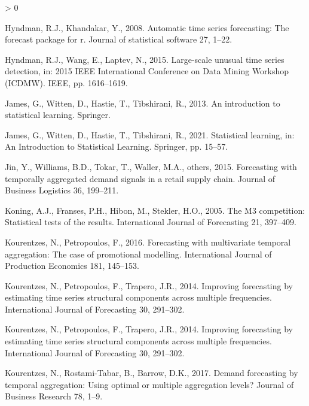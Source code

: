 \documentclass[]{elsarticle} %
\newlength{\cslhangindent}
\newenvironment{CSLReferences}[2] %
 {%
  \setlength{\parindent}{0pt}
  \ifodd #1 \everypar{\setlength{\hangindent}{\cslhangindent}}\ignorespaces\fi
  \ifnum #2 > 0
  \setlength{\parskip}{#2\baselineskip}
  \fi
 }%
 {}
\begin{document}
\begin{CSLReferences}{1}{0}
\leavevmode\hypertarget{ref-hyndman2008automatic}{}%
Hyndman, R.J., Khandakar, Y., 2008. Automatic time series forecasting:
The forecast package for r. Journal of statistical software 27, 1--22.

\leavevmode\hypertarget{ref-hyndman2015large}{}%
Hyndman, R.J., Wang, E., Laptev, N., 2015. Large-scale unusual time
series detection, in: 2015 IEEE International Conference on Data Mining
Workshop (ICDMW). IEEE, pp. 1616--1619.

\leavevmode\hypertarget{ref-james2013introduction}{}%
James, G., Witten, D., Hastie, T., Tibshirani, R., 2013. An introduction
to statistical learning. Springer.

\leavevmode\hypertarget{ref-james2021statistical}{}%
James, G., Witten, D., Hastie, T., Tibshirani, R., 2021. Statistical
learning, in: An Introduction to Statistical Learning. Springer, pp.
15--57.

\leavevmode\hypertarget{ref-jin2015forecasting}{}%
Jin, Y., Williams, B.D., Tokar, T., Waller, M.A., others, 2015.
Forecasting with temporally aggregated demand signals in a retail supply
chain. Journal of Business Logistics 36, 199--211.

\leavevmode\hypertarget{ref-MCB}{}%
Koning, A.J., Franses, P.H., Hibon, M., Stekler, H.O., 2005. The M3
competition: Statistical tests of the results. International Journal of
Forecasting 21, 397--409.

\leavevmode\hypertarget{ref-kourentzes2015forecasting}{}%
Kourentzes, N., Petropoulos, F., 2016. Forecasting with multivariate
temporal aggregation: The case of promotional modelling. International
Journal of Production Economics 181, 145--153.

\leavevmode\hypertarget{ref-kourentzes2014improving}{}%
Kourentzes, N., Petropoulos, F., Trapero, J.R., 2014. Improving
forecasting by estimating time series structural components across
multiple frequencies. International Journal of Forecasting 30, 291--302.

\leavevmode\hypertarget{ref-kourentzes2014improving}{}%
Kourentzes, N., Petropoulos, F., Trapero, J.R., 2014. Improving
forecasting by estimating time series structural components across
multiple frequencies. International Journal of Forecasting 30, 291--302.

\leavevmode\hypertarget{ref-kourentzes2017demand}{}%
Kourentzes, N., Rostami-Tabar, B., Barrow, D.K., 2017. Demand
forecasting by temporal aggregation: Using optimal or multiple
aggregation levels? Journal of Business Research 78, 1--9.


\end{CSLReferences}
\end{document}
